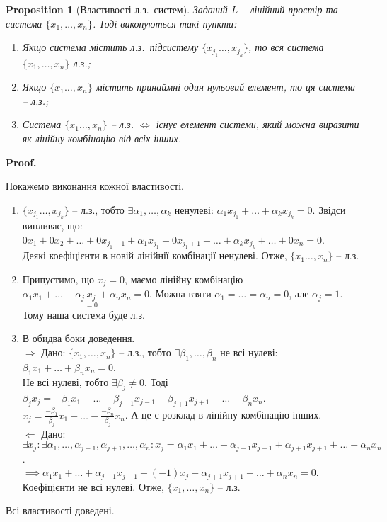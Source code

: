 \documentclass[a4paper, 10pt]{article}
\makeatletter
\def\rightproof{$\boxed{\Rightarrow}$ }
\def\leftproof{$\boxed{\Leftarrow}$ }
\theoremstyle{theoremdd}
\newtheorem{proposition}[theorem]{Proposition}
\renewenvironment{proof}[1][Proof.\\]{\par
\pushQED{\hfill \qed}%
\normalfont \topsep6\p@\@plus6\p@\relax
\trivlist
\item\relax
{\bfseries
#1\@addpunct{.}}\hspace\labelsep\ignorespaces
}{%
\popQED\endtrivlist\@endpefalse
}
\makeatother
\begin{document}
	\begin{proposition}[Властивості л.з.\ систем]
	Заданий $L$ -- лінійний простір та система $\{x_1,\dots,x_n\}$. Тоді виконуються такі пункти:
	\begin{enumerate}[nosep, wide = 0pt, label={\arabic*)}]
	\item Якщо система містить л.з.\ підсистему $\{x_{j_1} \dots, x_{j_k}\}$, то вся система $\{x_1,\dots,x_n\}$ л.з.;
	\item Якщо $\{x_1 \dots, x_n\}$ містить принаймні один нульовий елемент, то ця система -- л.з.;
	\item Система $\{x_1 \dots, x_n\}$ -- л.з. $\iff$ існує елемент системи, який можна виразити як лінійну комбінацію від всіх інших.
	\end{enumerate}
	\end{proposition}
	
	\begin{proof}
	Покажемо виконання кожної властивості.
	\begin{enumerate}[topsep=-\parskip, wide=0pt, label={\arabic*)}]
	\item $\{x_{j_1} \dots, x_{j_k}\}$ -- л.з., тобто $\exists \alpha_1, \dots, \alpha_k$ ненулеві: $\alpha_1 x_{j_1} + \dots + \alpha_k x_{j_k} = 0$. Звідси випливає, що:\\
	$0x_1 + 0x_2 + \dots + 0x_{j_1-1} + \alpha_1 x_{j_1} + 0x_{j_1 + 1} + \dots + \alpha_k x_{j_k} + \dots + 0 x_n = 0$.\\
	Деякі коефіцієнти в новій лінійнії комбінації ненулеві. Отже, $\{x_1 \dots, x_n\}$ -- л.з.
	\item Припустимо, що $x_j = 0$, маємо лінійну комбінацію $\alpha_1 x_1 + \dots + \alpha_j \underset{=0}{x_j} + \alpha_n x_n = 0$. Можна взяти $\alpha_1 = \dots = \alpha_n = 0$, але $\alpha_j = 1$. Тому наша система буде л.з.
	\item В обидва боки доведення.\\
	\rightproof Дано: $\{x_1, \dots, x_n\}$ -- л.з., тобто $\exists \beta_1, \dots, \beta_n$ не всі нулеві: $\beta_1 x_1 + \dots + \beta_n x_n = 0$.\\
	Не всі нулеві, тобто $\exists \beta_j \neq 0$. Тоді
	$\beta_j x_j = -\beta_1 x_1 - \dots - \beta_{j-1} x_{j-1} - \beta_{j+1} x_{j+1} - \dots - \beta_n x_n$.\\
	$\displaystyle x_j = \frac{-\beta_1}{\beta_j}x_1 - \dots - \frac{-\beta_n}{\beta_j}x_n$. А це є розклад в лінійну комбінацію інших.
	\bigskip \\
	\leftproof Дано: $\exists x_j: \exists \alpha_1, \dots, \alpha_{j-1}, \alpha_{j+1}, \dots, \alpha_n: x_j = \alpha_1 x_1 + \dots + \alpha_{j-1} x_{j-1} + \alpha_{j+1} x_{j+1} + \dots + \alpha_n x_n$.\\
	$\implies \alpha_1 x_1 + \dots + \alpha_{j-1} x_{j-1} + (-1)x_j + \alpha_{j+1} x_{j+1} + \dots + \alpha_n x_n = 0$.\\
	Коефіцієнти не всі нулеві. Отже, $\{x_1, \dots, x_n\}$ -- л.з.
	\end{enumerate}
	Всі властивості доведені.
	\end{proof}
	
\end{document}

